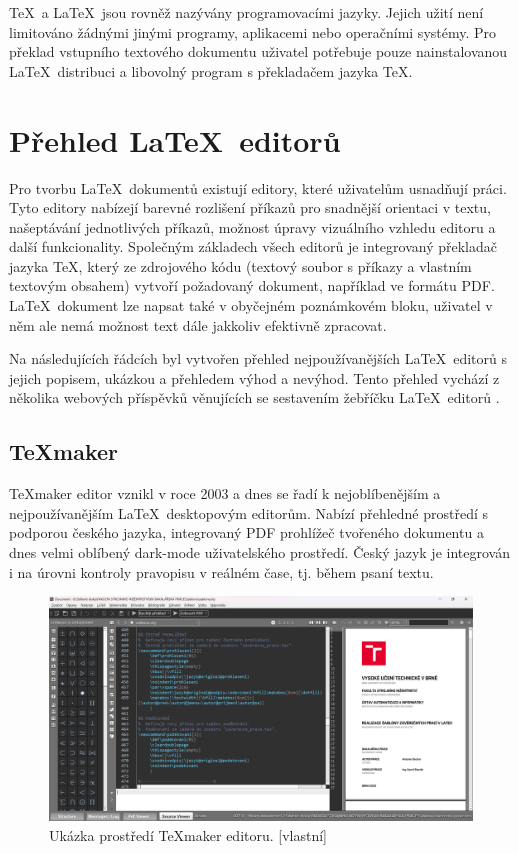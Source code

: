 \TeX\ a \LaTeX\ jsou rovněž nazývány programovacími jazyky. Jejich užití není limitováno žádnými jinými programy, aplikacemi nebo operačními systémy. Pro překlad vstupního textového dokumentu uživatel potřebuje pouze nainstalovanou \LaTeX\ distribuci a libovolný program s překladačem jazyka \TeX. \cite{Kopka}

\section{Přehled \LaTeX\ editorů}
\label{sec:prehled}
Pro tvorbu \LaTeX\ dokumentů existují editory, které uživatelům usnadňují práci. Tyto editory nabízejí barevné rozlišení příkazů pro snadnější orientaci v textu, našeptávání jednotlivých příkazů, možnost úpravy vizuálního vzhledu editoru a další funkcionality. Společným základech všech editorů je integrovaný překladač jazyka \TeX, který ze zdrojového kódu (textový soubor s příkazy a vlastním textovým obsahem) vytvoří požadovaný dokument, například ve formátu PDF. \LaTeX\ dokument lze napsat také v obyčejném poznámkovém bloku, uživatel v něm ale nemá možnost text dále jakkoliv efektivně zpracovat.

Na následujících řádcích byl vytvořen přehled nejpoužívanějších \LaTeX\ editorů s jejich popisem, ukázkou a přehledem výhod a nevýhod. Tento přehled vychází z několika webových příspěvků věnujících se sestavením žebříčku \LaTeX\ editorů \cite{Techpout}\cite{Guru99}\cite{Beebom}.

\subsection{\TeX maker}
\TeX maker editor vznikl v roce 2003 a dnes se řadí k nejoblíbenějším a nejpoužívanějším \LaTeX\ desktopovým editorům. Nabízí přehledné prostředí s podporou českého jazyka, integrovaný PDF prohlížeč tvořeného dokumentu a dnes velmi oblíbený dark-mode uživatelského prostředí. Český jazyk je integrován i na úrovni kontroly pravopisu v reálném čase, tj. během psaní textu. \cite{texmaker}

\begin{figure}[h]
	\centering
	\includegraphics[width=\textwidth]{obrázky/texmaker.png}
	\caption[Ukázka prostředí \TeX maker editoru.]{Ukázka prostředí \TeX maker editoru. [vlastní]}
	\label{fig:texmaker}
\end{figure}

